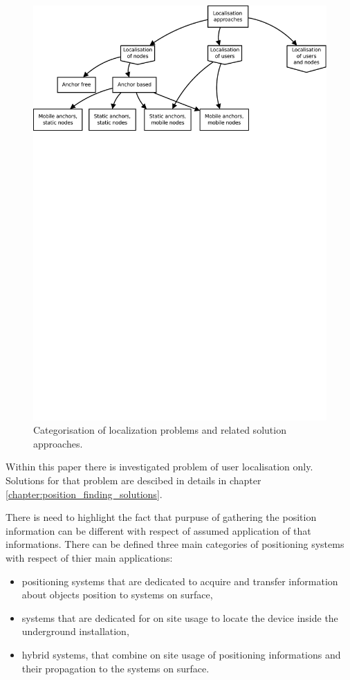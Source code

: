 \documentclass[../main.tex]{subfiles}
\begin{document}
\begin{figure}[ht]
\includegraphics[width=\textwidth, trim={0 20cm 0 0},clip]{pictures/localisation_approaches.pdf}
\centering
\caption{Categorisation of localization problems and related solution approaches\cite{discover_beacons_and_position}.}
\label{fig:localisation_approaches}
\end{figure}

Within this paper there is investigated problem of user localisation only. Solutions for that problem are descibed in details in chapter \ref{chapter:position_finding_solutions}.


There is need to highlight the fact that purpuse of gathering the position information can be different with respect of assumed application of that informations. There can be defined three main categories of positioning systems with respect of thier main applications:
\begin{itemize}
	\item positioning systems that are dedicated to acquire and transfer information about objects position to systems on surface,
	\item systems that are dedicated for on site usage to locate the device inside the underground installation,
	\item hybrid systems, that combine on site usage of positioning informations and their propagation to the systems on surface.
\end{itemize}
\end{document}
